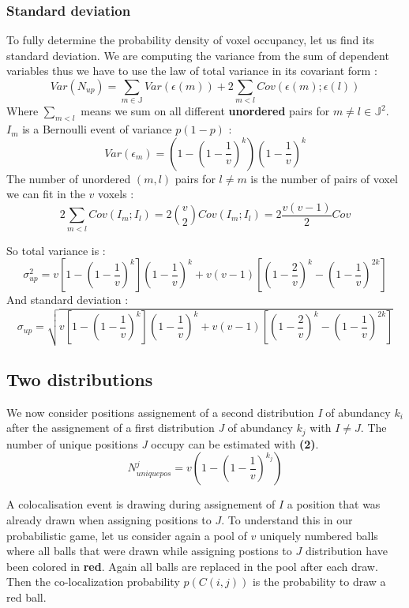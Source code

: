 \documentclass{article}
\begin{document}
\subsubsection{Standard deviation}
To fully determine the probability density of voxel occupancy, let us find its standard deviation. We are computing the variance from the sum of dependent variables
thus we have to use the law of total variance in its covariant form :
\[
Var(N_{up}) = \sum_{m \in \mathbb{J}} Var(\epsilon(m)) +  2\sum_{m < l }Cov(\epsilon(m);\epsilon(l))
\]
Where $\sum_{m<l}$ means we sum on all different \textbf{unordered} pairs for $m \neq l \in \mathbb{J}^2$.\newline
$I_m$ is a Bernoulli event of variance $p(1-p)$ :
\[
Var(\epsilon_m) = (1-(1-\frac{1}{v})^k)(1-\frac{1}{v})^k
\]
The number of unordered $(m,l)$ pairs for $l \neq m$ is the number of pairs of voxel we can fit in the $v$ voxels : 
\[
    2\sum_{m < l }Cov(I_m;I_l) = 2\binom{v}{2}Cov(I_m;I_l) = 2\frac{v(v-1)}{2}Cov 
\]

So total variance is :
\[
    \sigma^2_{up} = v[1-(1-\frac{1}{v})^k](1-\frac{1}{v})^k + v(v-1)[(1-\frac{2}{v})^k - (1-\frac{1}{v})^{2k}]
\]
And standard deviation :
\begin{equation}
    \sigma_{up} = \sqrt{v[1-(1-\frac{1}{v})^k](1-\frac{1}{v})^k + v(v-1)[(1-\frac{2}{v})^k - (1-\frac{1}{v})^{2k}]}
\end{equation}



\newpage
\subsection{Two distributions}
We now consider positions assignement of a second distribution \textit{I} of abundancy $ k_i $ after the assignement of a first 
distribution \textit{J} of abundancy $ k_j $ with $ I \neq J $. The number of unique positions \textit{J} occupy can be estimated with
\textbf{(2)}.
\[
N^j_{uniquepos} = v(1-(1-\frac{1}{v})^{k_j})
\]

A colocalisation event is drawing during assignement of $I$ a position that was already drawn when assigning positions to $J$. To
understand this in our probabilistic game, let us consider again a pool of $v$ uniquely numbered balls where all balls that were 
drawn while assigning postions to $J$ distribution have been colored in \textbf{red}. Again all balls are replaced in the pool after
each draw. Then the co-localization probability $p(C(i,j))$ is the
probability to draw a red ball.
\end{document}
